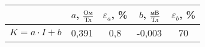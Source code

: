 \begin{tabular}{l|cccc}
	\toprule
	& $a$, $\frac{\text{Ом}}{\text{Тл}}$ & $\varepsilon_a$, \% & $b$, $\frac{\text{мВ}}{\text{Тл}}$ & $\varepsilon_b$, \% \\ \midrule
	$K=a\cdot I + b$ & 0,391 & 0,8 & -0,003 & 70 \\
\bottomrule
\end{tabular}